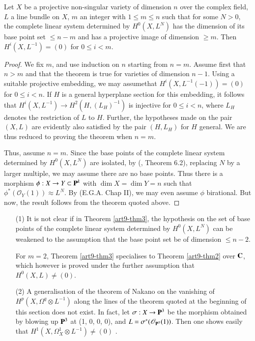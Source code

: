\begin{theorem}\label{art9-thm3}
Let $X$ be a projective non-singular variety of dimension $n$ over the
complex field, $L$ a line bundle on $X$, $m$ an integer with
$1\leqslant m \leqslant n$ such that for some $N>0$, the complete
linear system determined by $H^0(X, L^N)$ has the dimension of its
base point set $\leqslant n - m$ and has a projective image of
dimension $\geqslant m$. Then  $H^i (X, L^{-1}) = (0)$ for
$0 \leqslant i < m$.
\end{theorem}

\begin{proof}
We fix $m$, and use induction on $n$ starting from $n =m$. Assume
first that $n>m$ and that the theorem is true for varieties of
dimension $n-1$. Using a suitable projective embedding, we may
assume\pageoriginale that $H^i (X, L^{-1} (-1)) = (0)$ for
$0 \leqslant i < n$. If $H$ is a general hyperplane section for this
embedding, it follows that $H^i (X, L^{-1}) \to H^2 (H, (L_H)^{-1})$ is
injective for $0 \leqslant i < n$, where $L_H$ denotes the restriction
of $L$ to $H$. Further, the hypotheses made on the pair $(X,L)$ are
evidently also satisfied by the pair $(H, L_H)$ for $H$ general. We
are thus reduced to proving the theorem when $n =m$.

Thus, assume $n=m$. Since the base points of the complete linear
system determined by $H^0(X,L^N)$ are isolated, by (\cite{art9-key10}, Theorem
6.2), replacing $N$ by a larger multiple, we may assume there are no
base points. Thus there is a morphism $\phi: X \to Y \subset \mathbf{P}^k$
with $\dim X = \dim Y = n$ such that $\phi^* (\mathscr{O}_Y
(1)) \approx L^N$. By (E.G.A. Chap II), we may even assume $\phi$
birational. But now, the result follows from the theorem quoted above.
\end{proof}

\begin{remarks*}
\begin{enumerate}
\item[(1)] It is not clear if in Theorem \ref{art9-thm3}, the hypothesis on the set
of base points of the complete linear system determined by $H^0 (X,
L^N)$ can be weakened to the assumption that the base point set be of
dimension $\leqslant n-2$.

For $m=2$, Theorem \ref{art9-thm3} specialises to Theorem \ref{art9-thm2} over $\mathbf{C}$, which
however is proved under the further assumption that $H^0(X,L) \neq
(0)$.

\item[(2)] A generalisation of the theorem of Nakano on the vanishing
of $H^p(X, \Omega^q \otimes L^{-1})$ along the lines of the theorem
quoted at the beginning of this section does not exist. In fact, let
$\sigma: X \to \mathbf{P}^3$ be the morphism obtained by blowing up $\mathbf{P}^3$
at (1, 0, 0, 0), and $L = \sigma^* (\mathscr{O}_{\mathbf{P}^3}(1))$. Then
one shows easily that $H^1 (X, \Omega^1_X \otimes L^{-1}) \neq (0)$ .
\end{enumerate}
\end{remarks*}


